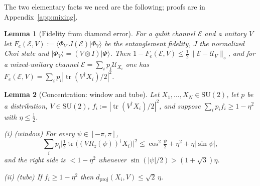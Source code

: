 \documentclass[aps,prx,twocolumn,superscriptaddress,nofootinbib,longbibliography]{revtex4-2}
\theoremstyle{plain}
\newtheorem{lemma}{Lemma}
\theoremstyle{definition}
\theoremstyle{remark}
\newcommand{\dproj}{d_{\mathrm{proj}}}
\newcommand{\SU}{\mathrm{SU}(2)}
\newcommand{\tr}{\operatorname{tr}}
\begin{document}
The two elementary facts we need are the following; proofs are in Appendix~\ref{app:mixing}.

\begin{lemma}[Fidelity from diamond error]\label{lem:fid}
For a qubit channel $\mathcal E$ and a unitary $V$ let $F_e(\mathcal E,V):=\langle\Phi_V|J(\mathcal E)|\Phi_V\rangle$ be the entanglement fidelity, $J$ the normalized Choi state and $|\Phi_V\rangle=(V\otimes I)|\Phi\rangle$. Then $1-F_e(\mathcal E,V)\le\tfrac12\|\mathcal E-\mathcal U_V\|_\diamond$, and for a mixed-unitary channel $\mathcal E=\sum_ip_i\mathcal U_{X_i}$ one has $F_e(\mathcal E,V)=\sum_ip_i|\tr(V^\dagger X_i)/2|^2$.
\end{lemma}

\begin{lemma}[Concentration: window and tube]\label{lem:conc}
Let $X_1,\dots,X_N\in\SU$, let $p$ be a distribution, $V\in\SU$, $f_i:=|\tr(V^\dagger X_i)/2|^2$, and suppose $\sum_ip_if_i\ge1-\eta^2$ with $\eta\le\tfrac12$.

(i) \emph{(window)} For every $\psi\in[-\pi,\pi]$,
\begin{equation}\label{eq:window}
\sum_ip_i\Big|\tfrac12\tr\big((VR_z(\psi))^\dagger X_i\big)\Big|^2\le\cos^2\tfrac\psi2+\eta^2+\eta|\sin\psi|,
\end{equation}
and the right side is $<1-\eta^2$ whenever $\sin(|\psi|/2)>(1+\sqrt3)\eta$.

(ii) \emph{(tube)} If $f_i\ge1-\eta^2$ then $\dproj(X_i,V)\le\sqrt2\,\eta$.
\end{lemma}
\end{document}

